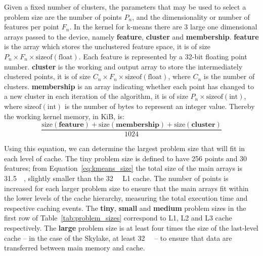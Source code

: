 \documentclass[../document.tex]{subfiles}
\begin{document}
Given a fixed number of clusters, the parameters that may be used to select a problem size are the number of points $P_n$, and the dimensionality or number of features per point $F_n$.
In the kernel for k-means there are 3 large one dimensional arrays passed to the device, namely {\bf feature}, {\bf cluster} and {\bf membership}.
{\bf feature} is the array which stores the unclustered feature space, it is of size $P_n \times F_n \times \text{sizeof}\left(\text{float}\right)$.
Each feature is represented by a 32-bit floating point number.
{\bf cluster} is the working and output array to store the intermediately clustered points, it is of size $C_n \times F_n \times \text{sizeof}\left(\text{float}\right)$, where $C_n$ is the number of clusters.
{\bf membership} is an array indicating whether each point has changed to a new cluster in each iteration of the algorithm, it is of size $P_n \times \text{sizeof}\left(\text{int}\right)$, where $\text{sizeof}\left(\text{int}\right)$ is the number of bytes to represent an integer value.
Thereby the working kernel memory, in KiB, is:
\begin{equation}
    \frac{\text{size}\left(\textbf{feature}\right)+\text{size}\left(\textbf{membership}\right)+\text{size}\left(\textbf{cluster}\right)}{1024}
    \label{eq:kmeans_size}
\end{equation}

Using this equation, we can determine the largest problem size that will fit in each level of cache.
The tiny problem size is defined to have 256 points and 30 features; from Equation~\ref{eq:kmeans_size} the total size of the main arrays is \SI{31.5}{\kibi\byte}, slightly smaller than the \SI{32}{\kibi\byte} L1 cache.
The number of points is increased for each larger problem size to ensure that the main arrays fit within the lower levels of the cache hierarchy, measuring the total execution time and respective caching events.
The {\bf tiny}, {\bf small} and {\bf medium} problem sizes in the first row of Table~\ref{tab:problem_sizes} correspond to L1, L2 and L3 cache respectively.
The {\bf large} problem size is at least four times the size of the last-level cache -- in the case of the Skylake, at least \SI{32}{\mebi\byte} -- to ensure that data are transferred between main memory and cache.

\end{document}
